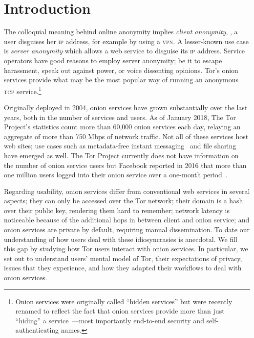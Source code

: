 \section{Introduction}
\label{sec:introduction}

The colloquial meaning behind online anonymity implies \emph{client anonymity},
\ie, a user disguises her \textsc{ip} address, for example by using a
\textsc{vpn}.  A lesser-known use case is \emph{server anonymity} which allows a
web service to disguise its \textsc{ip} address.  Service operators have good
reasons to employ server anonymity; be it to escape harassment, speak out
against power, or voice dissenting opinions.  Tor's onion services provide what
may be the most popular way of running an anonymous \textsc{tcp}
service.\footnote{Onion services were originally called ``hidden services'' but
were recently renamed to reflect the fact that onion services provide more than
just ``hiding'' a service~\cite{Johnson2015a}---most importantly end-to-end
security and self-authenticating names.}

Originally deployed in 2004, onion services have grown substantially over the
last years, both in the number of services and users.  As of January 2018, The
Tor Project's statistics count more than 60,000 onion services each day,
relaying an aggregate of more than 750 Mbps of network traffic.  Not all of
these services host web sites; use cases such as metadata-free instant
messaging~\cite{ricochet} and file sharing~\cite{onionshare} have emerged as
well.  The Tor Project currently does not have information on the number of
onion service users but Facebook reported in 2016 that more than one million
users logged into their onion service over a one-month
period~\cite{facebook-users}.

Regarding usability, onion services differ from conventional web services in
several aspects; \first they can only be accessed over the Tor network; \second
their domain is a hash over their public key, rendering them hard to remember;
\third network latency is noticeable because of the additional hops in between
client and onion service; and \fourth onion services are private by default,
requiring manual dissemination.  To date our understanding of how users deal
with these idiosyncrasies is anecdotal.  We fill this gap by studying how Tor
users interact with onion services.  In particular, we set out to understand
users' mental model of Tor, their expectations of privacy, issues that they
experience, and how they adapted their workflows to deal with onion services.

